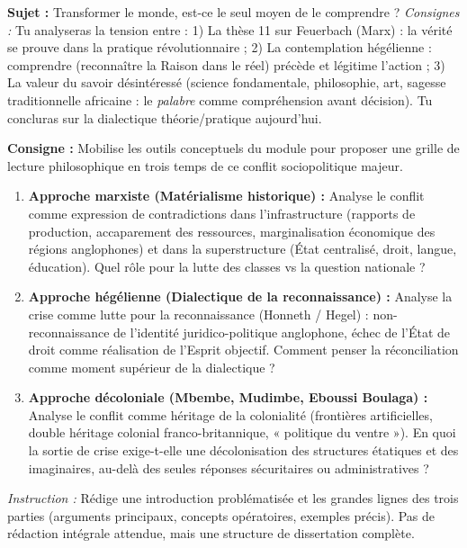 \documentclass[11pt]{article}
\newcommand{\cle}[1]{{\popxbold\color{popdark}#1}}
\begin{document}
\begin{exercice}
\textbf{Sujet :} \guillemotleft Transformer le monde, est-ce le seul moyen de le comprendre ? \guillemotright
\textit{Consignes :} Tu analyseras la tension entre : 1) La thèse 11 sur Feuerbach (Marx) : la vérité se prouve dans la pratique révolutionnaire ; 2) La contemplation hégélienne : comprendre (reconnaître la Raison dans le réel) précède et légitime l'action ; 3) La valeur du savoir désintéressé (science fondamentale, philosophie, art, sagesse traditionnelle africaine : le \emph{palabre} comme compréhension avant décision). Tu concluras sur la dialectique théorie/pratique aujourd'hui.
\end{exercice}

\begin{exercice}
\textbf{Consigne :} Mobilise les outils conceptuels du module pour proposer une grille de lecture philosophique en trois temps de ce conflit sociopolitique majeur.
\begin{enumerate}
\item \textbf{Approche marxiste (Matérialisme historique) :} Analyse le conflit comme expression de contradictions dans l'infrastructure (rapports de production, accaparement des ressources, marginalisation économique des régions anglophones) et dans la superstructure (État centralisé, droit, langue, éducation). Quel rôle pour la lutte des classes vs la question nationale ?
\item \textbf{Approche hégélienne (Dialectique de la reconnaissance) :} Analyse la crise comme lutte pour la \cle{reconnaissance} (Honneth / Hegel) : non-reconnaissance de l'identité juridico-politique anglophone, échec de l'\cle{État de droit} comme réalisation de l'Esprit objectif. Comment penser la \cle{réconciliation} comme moment supérieur de la dialectique ?
\item \textbf{Approche décoloniale (Mbembe, Mudimbe, Eboussi Boulaga) :} Analyse le conflit comme héritage de la \cle{colonialité} (frontières artificielles, double héritage colonial franco-britannique, « politique du ventre »). En quoi la sortie de crise exige-t-elle une \cle{décolonisation} des structures étatiques et des imaginaires, au-delà des seules réponses sécuritaires ou administratives ?
\end{enumerate}
\textit{Instruction :} Rédige une introduction problématisée et les grandes lignes des trois parties (arguments principaux, concepts opératoires, exemples précis). Pas de rédaction intégrale attendue, mais une structure de dissertation complète.
\end{exercice}
\end{document}

